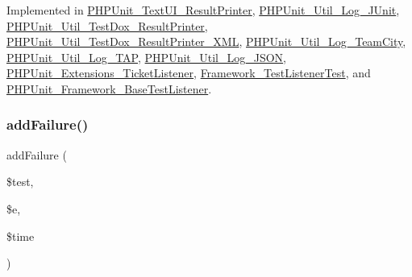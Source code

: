 Implemented in \mbox{\hyperlink{class_p_h_p_unit___text_u_i___result_printer_a320d7bc7d2f9264ee7ba7aca6fd2df41}{P\+H\+P\+Unit\+\_\+\+Text\+U\+I\+\_\+\+Result\+Printer}}, \mbox{\hyperlink{class_p_h_p_unit___util___log___j_unit_a320d7bc7d2f9264ee7ba7aca6fd2df41}{P\+H\+P\+Unit\+\_\+\+Util\+\_\+\+Log\+\_\+\+J\+Unit}}, \mbox{\hyperlink{class_p_h_p_unit___util___test_dox___result_printer_a320d7bc7d2f9264ee7ba7aca6fd2df41}{P\+H\+P\+Unit\+\_\+\+Util\+\_\+\+Test\+Dox\+\_\+\+Result\+Printer}}, \mbox{\hyperlink{class_p_h_p_unit___util___test_dox___result_printer___x_m_l_a320d7bc7d2f9264ee7ba7aca6fd2df41}{P\+H\+P\+Unit\+\_\+\+Util\+\_\+\+Test\+Dox\+\_\+\+Result\+Printer\+\_\+\+X\+ML}}, \mbox{\hyperlink{class_p_h_p_unit___util___log___team_city_a320d7bc7d2f9264ee7ba7aca6fd2df41}{P\+H\+P\+Unit\+\_\+\+Util\+\_\+\+Log\+\_\+\+Team\+City}}, \mbox{\hyperlink{class_p_h_p_unit___util___log___t_a_p_a320d7bc7d2f9264ee7ba7aca6fd2df41}{P\+H\+P\+Unit\+\_\+\+Util\+\_\+\+Log\+\_\+\+T\+AP}}, \mbox{\hyperlink{class_p_h_p_unit___util___log___j_s_o_n_a320d7bc7d2f9264ee7ba7aca6fd2df41}{P\+H\+P\+Unit\+\_\+\+Util\+\_\+\+Log\+\_\+\+J\+S\+ON}}, \mbox{\hyperlink{class_p_h_p_unit___extensions___ticket_listener_a320d7bc7d2f9264ee7ba7aca6fd2df41}{P\+H\+P\+Unit\+\_\+\+Extensions\+\_\+\+Ticket\+Listener}}, \mbox{\hyperlink{class_framework___test_listener_test_a320d7bc7d2f9264ee7ba7aca6fd2df41}{Framework\+\_\+\+Test\+Listener\+Test}}, and \mbox{\hyperlink{class_p_h_p_unit___framework___base_test_listener_a320d7bc7d2f9264ee7ba7aca6fd2df41}{P\+H\+P\+Unit\+\_\+\+Framework\+\_\+\+Base\+Test\+Listener}}.

\mbox{\label{interface_p_h_p_unit___framework___test_listener_a668f17b68705c5c8686bac690a6f719d}} 
\subsubsection{\texorpdfstring{add\+Failure()}{addFailure()}}
{\footnotesize\ttfamily add\+Failure (\begin{DoxyParamCaption}\item[{\mbox{\hyperlink{interface_p_h_p_unit___framework___test}{P\+H\+P\+Unit\+\_\+\+Framework\+\_\+\+Test}}}]{\$test,  }\item[{\mbox{\hyperlink{class_p_h_p_unit___framework___assertion_failed_error}{P\+H\+P\+Unit\+\_\+\+Framework\+\_\+\+Assertion\+Failed\+Error}}}]{\$e,  }\item[{}]{\$time }\end{DoxyParamCaption})}

